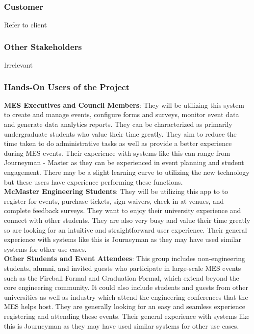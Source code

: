 \documentclass[12pt]{article}
\begin{document}
\subsubsection{Customer}
Refer to client
\subsubsection{Other Stakeholders}
Irrelevant
\subsubsection{Hands-On Users of the Project}
\textbf{MES Executives and Council Members}: They will be utilizing this system to create and manage events, configure forms and surveys, monitor event data and generate data analytics reports. They can be characterized as primarily undergraduate students who value their time greatly. They aim to reduce the time taken to do administrative tasks as well as provide a better experience during MES events. Their experience with systems like this can range from Journeyman - Master as they can be experienced in event planning and student engagement. There may be a slight learning curve to utilizing the new technology but these users have experience performing these functions.\\
\newline
\textbf{McMaster Engineering Students}: They will be utilizing this app to to register for events, purchase tickets, sign waivers, check in at venues, and complete feedback surveys. They want to enjoy their university experience and connect with other students, They are also very busy and value their time greatly so are looking for an intuitive and straightforward user experience. Their general experience with systems like this is Journeyman as they may have used similar systems for other use cases. \\
\newline
\textbf{Other Students and Event Attendees}: This group includes non-engineering students, alumni, and invited guests who participate in large-scale MES events such as the Fireball Formal and Graduation Formal, which extend beyond the core engineering community. It could also include students and guests from other universities as well as industry which attend the engineering conferences that the MES helps host. They are generally looking for an easy and seamless experience registering and attending these events. Their general experience with systems like this is Journeyman as they may have used similar systems for other use cases.
\end{document}
